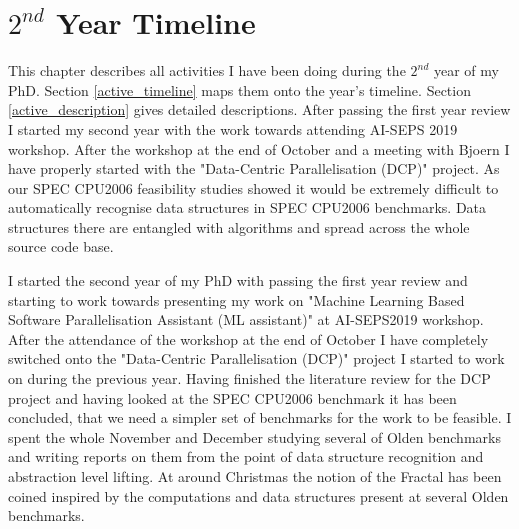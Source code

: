 \documentclass[10pt,a4paper]{report}
\begin{document}
\chapter{$2^{nd}$ Year Timeline}
\quad This chapter describes all activities I have been doing during the $2^{nd}$ year of my PhD. Section \ref{active_timeline} maps them onto the year's timeline. Section \ref{active_description} gives detailed descriptions. After passing the first year review I started my second year with the work towards attending AI-SEPS 2019 workshop. After the workshop at the end of October and a meeting with Bjoern I have properly started with the "Data-Centric Parallelisation (DCP)" project. As our SPEC CPU2006 feasibility studies showed it would be extremely difficult to automatically recognise data structures in SPEC CPU2006 benchmarks. Data structures there are entangled with algorithms and spread across the whole source code base.          


I started the second year of my PhD with passing the first year review and starting to work towards presenting my work on "Machine Learning Based Software Parallelisation Assistant (ML assistant)" at AI-SEPS2019 workshop. After the attendance of the workshop at the end of October I have completely switched onto the "Data-Centric Parallelisation (DCP)" project I started to work on during the previous year. Having finished the literature review for the DCP project and having looked at the SPEC CPU2006 benchmark it has been concluded, that we need a simpler set of benchmarks for the work to be feasible. I spent the whole November and December studying several of Olden benchmarks and writing reports on them from the point of data structure recognition and abstraction level lifting. At around Christmas the notion of the Fractal has been coined inspired by the computations and data structures present at several Olden benchmarks.         


   
\end{document}
